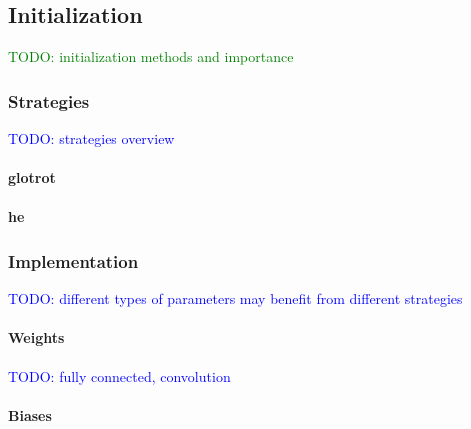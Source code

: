 \subsection{Initialization}

\textcolor{green}{TODO: initialization methods and importance}

\subsubsection{Strategies}

\textcolor{blue}{TODO: strategies overview}

\paragraph{glotrot}

\paragraph{he}

\subsubsection{Implementation}

\textcolor{blue}{TODO: different types of parameters may benefit from different strategies}

\paragraph{Weights}

\textcolor{blue}{TODO: fully connected, convolution}

\paragraph{Biases}